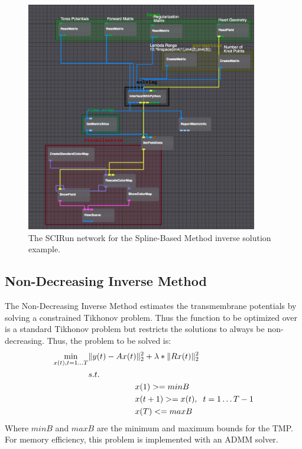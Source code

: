     \begin{figure}
        \begin{center}
        \includegraphics[width=0.9\textwidth]{ECGToolkitGuide_figures/splineInverse_Network.png}
        \caption{The SCIRun network for the Spline-Based Method inverse solution example.}
        \label{fig:splineInverse}
        \end{center}
    \end{figure}



\subsection{Non-Decreasing Inverse Method}

    The Non-Decreasing Inverse Method estimates the transmembrane potentials by solving a constrained Tikhonov problem.
    Thus the function to be optimized over is a standard Tikhonov problem but restricts the solutions to always be non-decreasing.
    Thus, the problem to be solved is:
    \begin{equation}\begin{split}
    		\min_{x(t), t=1\dots T} &\|y(t) - Ax(t)\|_2^2 + \lambda*\|Rx(t)\|_2^2 \\
    		&s.t.\\
      		&\hspace{2cm}x(1) >= minB\\
         	&\hspace{2cm}x(t+1) >= x(t), \hspace{.2cm}t=1\dots T-1\\
         	&\hspace{2cm}x(T) <= maxB
    \end{split}
    \end{equation}
    Where $minB$ and $maxB$ are the minimum and maximum bounds for the TMP.
    For memory efficiency, this problem is implemented with an ADMM solver.

